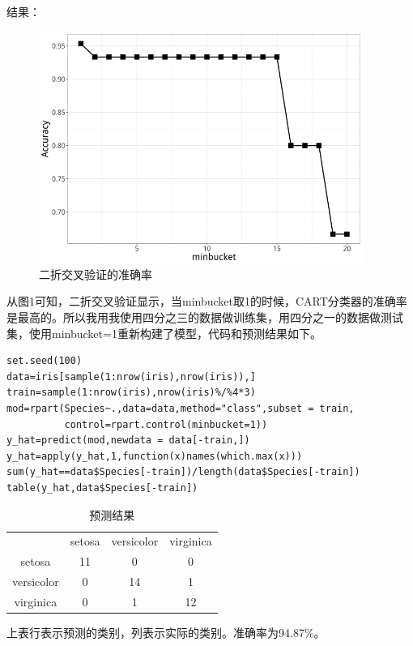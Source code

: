 \documentclass[11pt,a4paper,onecolumn]{article}
\begin{document}
结果：

\begin{figure}[H]
	\centering
	\includegraphics[width=300pt]{交叉验证.png}
	\caption{二折交叉验证的准确率}
\end{figure}

从图1可知，二折交叉验证显示，当minbucket取1的时候，CART分类器的准确率是最高的。所以我用我使用四分之三的数据做训练集，用四分之一的数据做测试集，使用minbucket=1重新构建了模型，代码和预测结果如下。

\begin{lstlisting}
set.seed(100)
data=iris[sample(1:nrow(iris),nrow(iris)),]
train=sample(1:nrow(iris),nrow(iris)%/%4*3)
mod=rpart(Species~.,data=data,method="class",subset = train,
          control=rpart.control(minbucket=1))
y_hat=predict(mod,newdata = data[-train,])
y_hat=apply(y_hat,1,function(x)names(which.max(x)))
sum(y_hat==data$Species[-train])/length(data$Species[-train])
table(y_hat,data$Species[-train])
\end{lstlisting}

\begin{table}[H]
\centering
\caption{预测结果}
\begin{tabular}{cccc}
  \hline
              & setosa & versicolor & virginica \\
  setosa      & 11     & 0          & 0         \\
	versicolor  & 0      & 14         & 1         \\
	virginica   & 0      & 1          & 12        \\
	\hline
  \end{tabular}
\end{table}

上表行表示预测的类别，列表示实际的类别。准确率为94.87\%。
\end{document}
